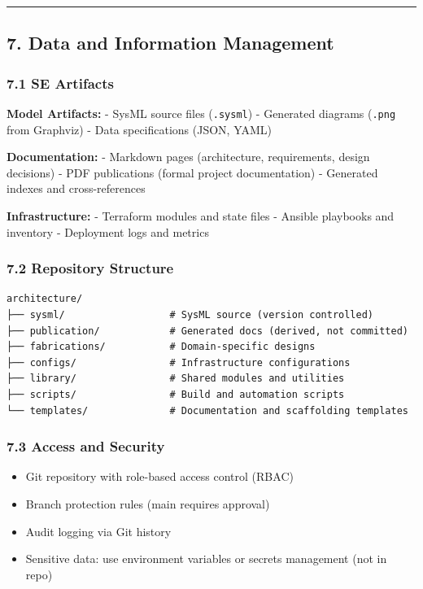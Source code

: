 \documentclass[12pt]{article}
\providecommand{\tightlist}{%
  \setlength{\itemsep}{0pt}\setlength{\parskip}{0pt}}
\begin{document}
\begin{center}\rule{0.5\linewidth}{0.5pt}\end{center}

\subsection{7. Data and Information
Management}\label{data-and-information-management}

\subsubsection{7.1 SE Artifacts}\label{se-artifacts}

\textbf{Model Artifacts:} - SysML source files (\texttt{.sysml}) -
Generated diagrams (\texttt{.png} from Graphviz) - Data specifications
(JSON, YAML)

\textbf{Documentation:} - Markdown pages (architecture, requirements,
design decisions) - PDF publications (formal project documentation) -
Generated indexes and cross-references

\textbf{Infrastructure:} - Terraform modules and state files - Ansible
playbooks and inventory - Deployment logs and metrics

\subsubsection{7.2 Repository Structure}\label{repository-structure}

\begin{verbatim}
architecture/
├── sysml/                  # SysML source (version controlled)
├── publication/            # Generated docs (derived, not committed)
├── fabrications/           # Domain-specific designs
├── configs/                # Infrastructure configurations
├── library/                # Shared modules and utilities
├── scripts/                # Build and automation scripts
└── templates/              # Documentation and scaffolding templates
\end{verbatim}

\subsubsection{7.3 Access and Security}\label{access-and-security}

\begin{itemize}
\tightlist
\item
  Git repository with role-based access control (RBAC)
\item
  Branch protection rules (main requires approval)
\item
  Audit logging via Git history
\item
  Sensitive data: use environment variables or secrets management (not
  in repo)
\end{itemize}
\end{document}
